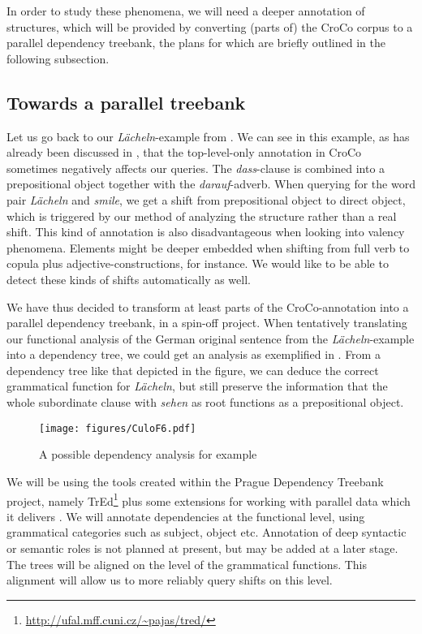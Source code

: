 \documentclass[output=paper]{LSP/langsci}
\begin{document}
In order to study these phenomena, we will need a deeper annotation of structures, which will be provided by converting (parts of) the CroCo corpus to a parallel dependency treebank, the plans for which are briefly outlined in the following subsection.

\subsection{Towards a parallel treebank}\label{sec:culo:5.2}

Let us go back to our \textit{Lächeln}-example  from . We can see in this example, as has already been discussed in , that the top-level-only annotation in CroCo sometimes negatively affects our queries. The \textit{dass}-clause is combined into a prepositional object together with the \textit{darauf}-adverb. When querying for the word pair \textit{Lächeln} and \textit{smile}, we get a shift from prepositional object to direct object, which is triggered by our method of analyzing the structure rather than a real shift. This kind of annotation is also disadvantageous when looking into valency phenomena. Elements might be deeper embedded when shifting from full verb to copula plus adjective-constructions, for instance. We would like to be able to detect these kinds of shifts automatically as well.

We have thus decided to transform at least parts of the CroCo-annotation into a parallel dependency treebank, in a spin-off project. When tentatively translating our functional analysis of the German original sentence from the \textit{Lächeln}-example into a dependency tree, we could get an analysis as exemplified in . From a dependency tree like that depicted in the figure, we can deduce the correct grammatical function for \textit{Lächeln}, but still preserve the information that the whole subordinate clause with \textit{sehen} as root functions as a prepositional object.

\begin{figure} 
\texttt{[image: figures/CuloF6.pdf]}
\caption{A possible dependency analysis for example }
\label{fig:culo:6}
\end{figure}


We will be using the tools created within the Prague Dependency Treebank project, namely TrEd\footnote{\url{http://ufal.mff.cuni.cz/~pajas/tred/}} plus some extensions for working with parallel data which it delivers \citep{BöhmováEtAl2000}. We will annotate dependencies at the functional level, using grammatical categories such as subject, object etc. Annotation of deep syntactic or semantic roles is not planned at present, but may be added at a later stage. The trees will be aligned on the level of the grammatical functions. This alignment will allow us to more reliably query shifts on this level.



{\sloppy 
\printbibliography[heading=subbibliography,notkeyword=this]
}
\end{document}
